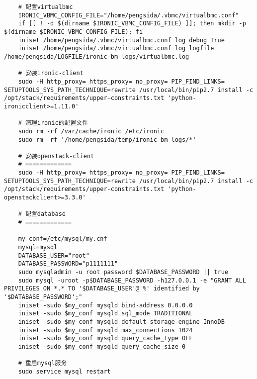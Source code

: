 \documentclass[a4paper,left=1.5cm,right=1.5cm,11pt]{article}
\begin{document}
\begin{lstlisting}
	# 配置virtualbmc
	IRONIC_VBMC_CONFIG_FILE="/home/pengsida/.vbmc/virtualbmc.conf"
	if [[ ! -d $(dirname $IRONIC_VBMC_CONFIG_FILE) ]]; then mkdir -p $(dirname $IRONIC_VBMC_CONFIG_FILE); fi
	iniset /home/pengsida/.vbmc/virtualbmc.conf log debug True
    iniset /home/pengsida/.vbmc/virtualbmc.conf log logfile /home/pengsida/LOGFILE/ironic-bm-logs/virtualbmc.log

	# 安装ironic-client
	sudo -H http_proxy= https_proxy= no_proxy= PIP_FIND_LINKS= SETUPTOOLS_SYS_PATH_TECHNIQUE=rewrite /usr/local/bin/pip2.7 install -c /opt/stack/requirements/upper-constraints.txt 'python-ironicclient>=1.11.0'

	# 清理ironic的配置文件
	sudo rm -rf /var/cache/ironic /etc/ironic
	sudo rm -rf '/home/pengsida/temp/ironic-bm-logs/*'

	# 安装openstack-client
	# =============
	sudo -H http_proxy= https_proxy= no_proxy= PIP_FIND_LINKS= SETUPTOOLS_SYS_PATH_TECHNIQUE=rewrite /usr/local/bin/pip2.7 install -c /opt/stack/requirements/upper-constraints.txt 'python-openstackclient>=3.3.0'

	# 配置database
	# =============

	my_conf=/etc/mysql/my.cnf
    mysql=mysql
	DATABASE_USER="root"
	DATABASE_PASSWORD="p1111111"
	sudo mysqladmin -u root password $DATABASE_PASSWORD || true
    sudo mysql -uroot -p$DATABASE_PASSWORD -h127.0.0.1 -e "GRANT ALL PRIVILEGES ON *.* TO '$DATABASE_USER'@'%' identified by '$DATABASE_PASSWORD';"
    iniset -sudo $my_conf mysqld bind-address 0.0.0.0
    iniset -sudo $my_conf mysqld sql_mode TRADITIONAL
    iniset -sudo $my_conf mysqld default-storage-engine InnoDB
    iniset -sudo $my_conf mysqld max_connections 1024
    iniset -sudo $my_conf mysqld query_cache_type OFF
    iniset -sudo $my_conf mysqld query_cache_size 0

	# 重启mysql服务
	sudo service mysql restart
	\end{lstlisting}
	
\end{document}
